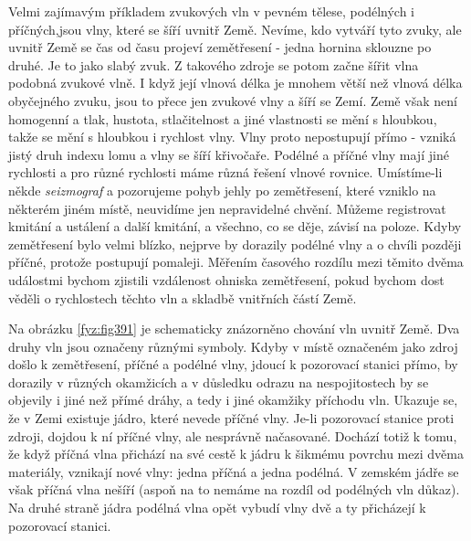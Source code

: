 {  Velmi zajímavým příkladem zvukových vln v pevném tělese, podélných i příčných,jsou vlny, které se 
  šíří uvnitř Země. Nevíme, kdo vytváří tyto zvuky, ale uvnitř Země se čas od času projeví 
  zemětřesení - jedna hornina sklouzne po druhé. Je to jako slabý zvuk. Z takového zdroje se potom 
  začne šířit vlna podobná zvukové vlně. I když její vlnová délka je mnohem větší než vlnová délka 
  obyčejného zvuku, jsou to přece jen zvukové vlny a šíří se Zemí. Země však není homogenní a tlak, 
  hustota, stlačitelnost a jiné vlastnosti se mění s hloubkou, takže se mění s hloubkou i rychlost 
  vlny. Vlny proto nepostupují přímo - vzniká jistý druh indexu lomu a vlny se šíří křivočaře. 
  Podélné a příčné vlny mají jiné rychlosti a pro různé rychlosti máme různá řešení vlnové rovnice. 
  Umístíme-li někde \emph{seizmograf} a pozorujeme pohyb jehly po zemětřesení, které vzniklo na 
  některém jiném místě, neuvidíme jen nepravidelné chvění. Můžeme registrovat kmitání a ustálení a 
  další kmitání, a všechno, co se děje, závisí na poloze. Kdyby zemětřesení bylo velmi blízko, 
  nejprve by dorazily podélné vlny a o chvíli později příčné, protože postupují pomaleji. Měřením 
  časového rozdílu mezi těmito dvěma událostmi bychom zjistili vzdálenost ohniska zemětřesení, 
  pokud bychom dost věděli o rychlostech těchto vln a skladbě vnitřních částí Země.
  
  Na obrázku \ref{fyz:fig391} je schematicky znázorněno chování vln uvnitř Země. Dva druhy vln jsou 
  označeny různými symboly. Kdyby v místě označeném jako zdroj došlo k zemětřesení, příčné a 
  podélné vlny, jdoucí k pozorovací stanici přímo, by dorazily v různých okamžicích a v důsledku 
  odrazu na nespojitostech by se objevily i jiné než přímé dráhy, a tedy i jiné okamžiky příchodu 
  vln. Ukazuje se, že v Zemi existuje jádro, které nevede příčné vlny. Je-li pozorovací stanice 
  proti zdroji, dojdou k ní příčné vlny, ale nesprávně načasované. Dochází totiž k tomu, že když 
  příčná vlna přichází na své cestě k jádru k šikmému povrchu mezi dvěma materiály, vznikají nové 
  vlny: jedna příčná a jedna podélná. V zemském jádře se však příčná vlna nešíří (aspoň na to 
  nemáme na rozdíl od podélných vln důkaz). Na druhé straně jádra podélná vlna opět vybudí vlny dvě 
  a ty přicházejí k pozorovací stanici.
  
}
